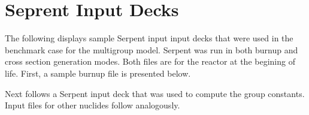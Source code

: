 \chapter{Seprent Input Decks}
\label{appendix_serpent_input}

The following displays sample Serpent input input decks that were used in the benchmark 
case for the multigroup model.  Serpent was run in both burnup and cross section generation 
modes.  Both files are for the reactor at the begining of life.  First, a sample burnup file 
is presented below.  

\vspace{1em}



\vspace{1em}

Next follows a Serpent input deck that was used to compute the  group constants. 
Input files for other nuclides follow analogously.

\vspace{1em}



